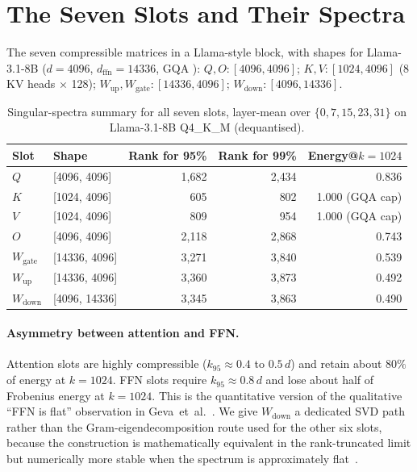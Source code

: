 \documentclass[11pt]{article}
\begin{document}
\section{The Seven Slots and Their Spectra}
\label{sec:spectra}

The seven compressible matrices in a Llama-style block, with shapes for
Llama-3.1-8B ($d{=}4096$, $d_\text{ffn}{=}14336$, GQA \cite{ainslie2023gqa}):
$Q,O\!:\![4096,4096]$;
$K,V\!:\![1024,4096]$ (8 KV heads $\times$ 128);
$W_\text{up},W_\text{gate}\!:\![14336,4096]$;
$W_\text{down}\!:\![4096,14336]$.

\begin{table}[h]\centering\small
\caption{Singular-spectra summary for all seven slots, layer-mean over
$\{0,7,15,23,31\}$ on Llama-3.1-8B Q4\_K\_M (dequantised).}
\label{tab:slots}
\begin{tabular}{@{}llrrr@{}}
\toprule
Slot & Shape & Rank for 95\% & Rank for 99\% & Energy@$k{=}1024$ \\
\midrule
$Q$               & [4096, 4096]   & 1{,}682 & 2{,}434 & 0.836 \\
$K$               & [1024, 4096]   &   605   &   802   & 1.000 (GQA cap) \\
$V$               & [1024, 4096]   &   809   &   954   & 1.000 (GQA cap) \\
$O$               & [4096, 4096]   & 2{,}118 & 2{,}868 & 0.743 \\
$W_\text{gate}$   & [14336, 4096]  & 3{,}271 & 3{,}840 & 0.539 \\
$W_\text{up}$     & [14336, 4096]  & 3{,}360 & 3{,}873 & 0.492 \\
$W_\text{down}$   & [4096, 14336]  & 3{,}345 & 3{,}863 & 0.490 \\
\bottomrule
\end{tabular}
\end{table}

\paragraph{Asymmetry between attention and FFN.}
Attention slots are highly compressible ($k_{95}\approx 0.4$ to $0.5\,d$)
and retain about $80\%$ of energy at $k{=}1024$. FFN slots require
$k_{95}\approx 0.8\,d$ and lose about half of Frobenius energy at
$k{=}1024$. This is the quantitative version of the qualitative
``FFN is flat'' observation in Geva~et~al.~\cite{geva2021ffn}. We give
$W_\text{down}$ a dedicated SVD path rather than the
Gram-eigendecomposition route used for the other six slots, because
the construction is mathematically equivalent in the rank-truncated
limit but numerically more stable when the spectrum is approximately
flat~\cite{golub2013matrix,eckart1936}.
\end{document}
